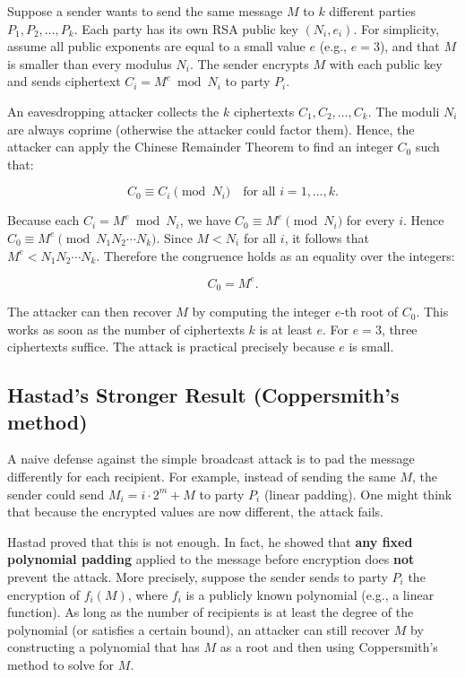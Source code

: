 Suppose a sender wants to send the same message \(M\) to \(k\) different parties \(P_1, P_2, \dots, P_k\). Each party has its own RSA public key \((N_i, e_i)\). For simplicity, assume all public exponents are equal to a small value \(e\) (e.g., \(e = 3\)), and that \(M\) is smaller than every modulus \(N_i\). The sender encrypts \(M\) with each public key and sends ciphertext \(C_i = M^{e} \bmod N_i\) to party \(P_i\).

An eavesdropping attacker collects the \(k\) ciphertexts \(C_1, C_2, \dots, C_k\). The moduli \(N_i\) are always coprime (otherwise the attacker could factor them). Hence, the attacker can apply the Chinese Remainder Theorem to find an integer \(C_0\) such that:

\[
C_0 \equiv C_i \pmod{N_i} \quad \text{for all } i = 1, \dots, k.
\]

Because each \(C_i = M^e \bmod N_i\), we have \(C_0 \equiv M^e \pmod{N_i}\) for every \(i\). Hence \(C_0 \equiv M^e \pmod{N_1 N_2 \cdots N_k}\). Since \(M < N_i\) for all \(i\), it follows that \(M^e < N_1 N_2 \cdots N_k\). Therefore the congruence holds as an equality over the integers:

\[
C_0 = M^e.
\]

The attacker can then recover \(M\) by computing the integer \(e\)-th root of \(C_0\). This works as soon as the number of ciphertexts \(k\) is at least \(e\). For \(e = 3\), three ciphertexts suffice. The attack is practical precisely because \(e\) is small.

\subsection{Hastad's Stronger Result (Coppersmith’s method)}

A naive defense against the simple broadcast attack is to pad the message differently for each recipient. For example, instead of sending the same \(M\), the sender could send \(M_i = i \cdot 2^m + M\) to party \(P_i\) (linear padding). One might think that because the encrypted values are now different, the attack fails.

Hastad proved that this is not enough. In fact, he showed that \textbf{any fixed polynomial padding} applied to the message before encryption does \textbf{not} prevent the attack. More precisely, suppose the sender sends to party \(P_i\) the encryption of \(f_i(M)\), where \(f_i\) is a publicly known polynomial (e.g., a linear function). As long as the number of recipients is at least the degree of the polynomial (or satisfies a certain bound), an attacker can still recover \(M\) by constructing a polynomial that has \(M\) as a root and then using Coppersmith's method to solve for \(M\).

